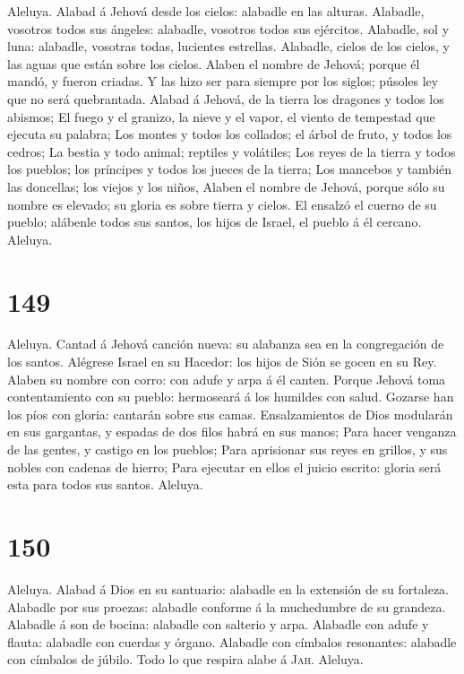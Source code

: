  Aleluya. Alabad á Jehová desde los cielos: alabadle en
las alturas.  Alabadle, vosotros todos sus ángeles:
alabadle, vosotros todos sus ejércitos.  Alabadle, sol y
luna: alabadle, vosotras todas, lucientes estrellas. 
Alabadle, cielos de los cielos, y las aguas que están sobre los cielos.
 Alaben el nombre de Jehová; porque él mandó, y fueron
criadas.  Y las hizo ser para siempre por los siglos;
púsoles ley que no será quebrantada.  Alabad á Jehová, de
la tierra los dragones y todos los abismos;  El fuego y el
granizo, la nieve y el vapor, el viento de tempestad que ejecuta su
palabra;  Los montes y todos los collados; el árbol de
fruto, y todos los cedros;  La bestia y todo animal;
reptiles y volátiles;  Los reyes de la tierra y todos los
pueblos; los príncipes y todos los jueces de la tierra; 
Los mancebos y también las doncellas; los viejos y los niños,
 Alaben el nombre de Jehová, porque sólo su nombre es
elevado; su gloria es sobre tierra y cielos.  El ensalzó
el cuerno de su pueblo; alábenle todos sus santos, los hijos de Israel,
el pueblo á él cercano. Aleluya.

\hypertarget{section-148}{%
\section{149}\label{section-148}}

 Aleluya. Cantad á Jehová canción nueva: su alabanza sea
en la congregación de los santos.  Alégrese Israel en su
Hacedor: los hijos de Sión se gocen en su Rey.  Alaben su
nombre con corro: con adufe y arpa á él canten.  Porque
Jehová toma contentamiento con su pueblo: hermoseará á los humildes con
salud.  Gozarse han los píos con gloria: cantarán sobre
sus camas.  Ensalzamientos de Dios modularán en sus
gargantas, y espadas de dos filos habrá en sus manos; 
Para hacer venganza de las gentes, y castigo en los pueblos;
 Para aprisionar sus reyes en grillos, y sus nobles con
cadenas de hierro;  Para ejecutar en ellos el juicio
escrito: gloria será esta para todos sus santos. Aleluya.

\hypertarget{section-149}{%
\section{150}\label{section-149}}

 Aleluya. Alabad á Dios en su santuario: alabadle en la
extensión de su fortaleza.  Alabadle por sus proezas:
alabadle conforme á la muchedumbre de su grandeza. 
Alabadle á son de bocina: alabadle con salterio y arpa. 
Alabadle con adufe y flauta: alabadle con cuerdas y órgano.
 Alabadle con címbalos resonantes: alabadle con címbalos
de júbilo.  Todo lo que respira alabe á \textsc{Jah}.
Aleluya.
